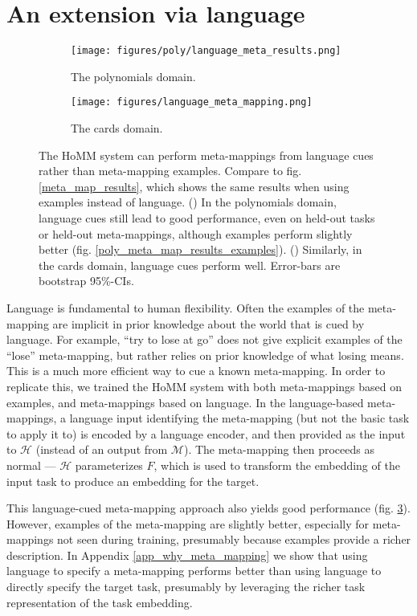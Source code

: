 \documentclass{article}
\begin{document}
\section{An extension via language}
\vspace{-0.5em} %
\begin{figure}
\centering
\begin{subfigure}{0.5\textwidth}
\texttt{[image: figures/poly/language\_meta\_results.png]}
\caption{The polynomials domain.}
\label{poly_meta_map_results_language}
\end{subfigure}%
\begin{subfigure}{0.5\textwidth}
\texttt{[image: figures/language\_meta\_mapping.png]}
\caption{The cards domain.}
\label{cards_meta_map_results_language}
\end{subfigure}
\caption{The HoMM system can perform meta-mappings from language cues rather than meta-mapping examples. Compare to fig. \ref{meta_map_results}, which shows the same results when using examples instead of language. () In the polynomials domain, language cues still lead to good performance, even on held-out tasks or held-out meta-mappings, although examples perform slightly better (fig. \ref{poly_meta_map_results_examples}). () Similarly, in the cards domain, language cues perform well. Error-bars are bootstrap 95\%-CIs.}
\label{language_meta_map_results}
\end{figure}
Language is fundamental to human flexibility. Often the examples of the meta-mapping are implicit in prior knowledge about the world that is cued by language. For example, ``try to lose at go'' does not give explicit examples of the ``lose'' meta-mapping, but rather relies on prior knowledge of what losing means. This is a much more efficient way to cue a known meta-mapping. In order to replicate this, we trained the HoMM system with both meta-mappings based on examples, and meta-mappings based on language. In the language-based meta-mappings, a language input identifying the meta-mapping (but not the basic task to apply it to) is encoded by a language encoder, and then provided as the input to $\mathcal{H}$ (instead of an output from $\mathcal{M}$). The meta-mapping then proceeds as normal --- $\mathcal{H}$ parameterizes $F$, which is used to transform the embedding of the input task to produce an embedding for the target. \par
This language-cued meta-mapping approach also yields good performance (fig. \ref{language_meta_map_results}). However, examples of the meta-mapping are slightly better, especially for meta-mappings not seen during training, presumably because examples provide a richer description. In Appendix \ref{app_why_meta_mapping} we show that using language to specify a meta-mapping performs better than using language to directly specify the target task, presumably by leveraging the richer task representation of the task embedding. \par
\end{document}
